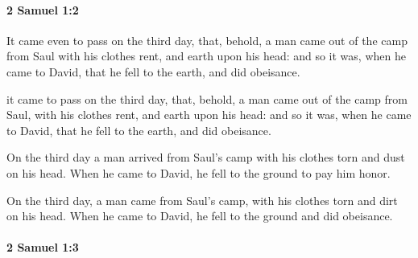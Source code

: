 		\paragraph{2 Samuel 1:2} %
			\label{2SAMUEL-1-2}

			It came even to pass on the third day, that, behold, a man came out of the camp from Saul with his clothes rent, and earth upon his head: and so it was, when he came to David, that he fell to the earth, and did obeisance.

			\begin{versebox}
					\item[BHS] 
					\item[ASV] it came to pass on the third day, that, behold, a man came out of the camp from Saul, with his clothes rent, and earth upon his head: and so it was, when he came to David, that he fell to the earth, and did obeisance.
					\item[NIV] On the third day a man arrived from Saul’s camp with his clothes torn and dust on his head. When he came to David, he fell to the ground to pay him honor.
					\item[NRSV] On the third day, a man came from Saul’s camp, with his clothes torn and dirt on his head. When he came to David, he fell to the ground and did obeisance.
			\end{versebox}

		\paragraph{2 Samuel 1:3} %
			\label{2SAMUEL-1-3}

